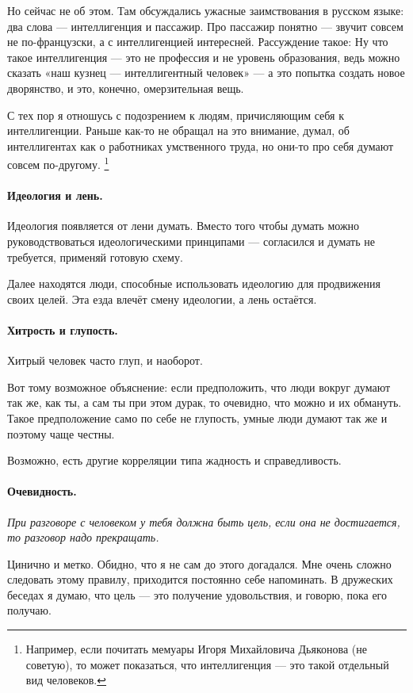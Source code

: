 \documentclass{book}
\begin{document}
Но сейчас не об этом.
Там обсуждались ужасные заимствования в русском языке: два слова --- интеллигенция и пассажир.
Про пассажир понятно --- звучит совсем не по-французски, а с интеллигенцией интересней.
Рассуждение такое: Ну что такое интеллигенция --- это не профессия и не уровень образования, ведь можно сказать «наш кузнец --- интеллигентный человек» --- а это попытка создать новое дворянство, и это, конечно, омерзительная вещь.

С тех пор я отношусь с подозрением к людям, причисляющим себя к интеллигенции.
Раньше как-то не обращал на это внимание, думал, об интеллигентах как о работниках умственного труда, но они-то про себя думают совсем по-другому.%
\footnote{Например, если почитать мемуары Игоря Михайловича Дьяконова (не советую), то может показаться, что интеллигенция --- это такой отдельный вид человеков.}

\paragraph{Идеология и лень.}
Идеология появляется от лени думать.
Вместо того чтобы думать можно руководствоваться идеологическими принципами --- согласился и думать не требуется, применяй готовую схему.

Далее находятся люди, способные использовать идеологию для продвижения своих целей.
Эта езда влечёт смену идеологии, а лень остаётся.

\paragraph{Хитрость и глупость.}
Хитрый человек часто глуп, и наоборот.

Вот тому возможное объяснение:
если предположить, что люди вокруг думают так же, как ты, а сам ты при этом дурак, то очевидно, что можно и их обмануть.
Такое предположение само по себе не глупость, умные люди думают так же и поэтому чаще честны.

Возможно, есть другие корреляции типа жадность и справедливость.  

\paragraph{Очевидность.}
\textit{При разговоре с человеком у тебя должна быть цель, если она не достигается, то разговор надо прекращать.}

Цинично и метко.
Обидно, что я не сам до этого догадался.
Мне очень сложно следовать этому правилу, приходится постоянно себе напоминать.
В дружеских беседах я думаю, что цель --- это получение удовольствия, и говорю, пока его получаю.
\end{document}
